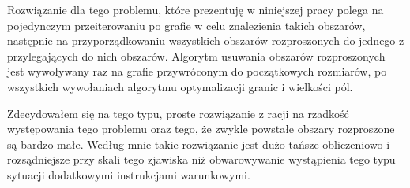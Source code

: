 Rozwiązanie dla tego problemu, które prezentuję w niniejszej pracy polega na pojedynczym przeiterowaniu po grafie
w celu znalezienia takich obszarów, następnie na przyporządkowaniu wszystkich obszarów rozproszonych do jednego
z przylegających do nich obszarów.
Algorytm usuwania obszarów rozproszonych jest wywoływany raz na grafie przywróconym do początkowych rozmiarów,
po wszystkich wywołaniach
algorytmu optymalizacji granic i wielkości pól.

Zdecydowałem się na tego typu, proste rozwiązanie z racji na rzadkość występowania tego problemu oraz tego, że zwykle
powstałe obszary rozproszone są bardzo małe.
Według mnie takie rozwiązanie jest dużo tańsze obliczeniowo i rozsądniejsze przy skali tego
zjawiska niż obwarowywanie wystąpienia tego typu sytuacji dodatkowymi instrukcjami warunkowymi.